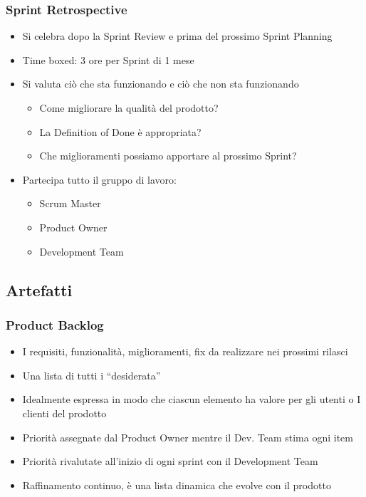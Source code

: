 \subsubsection{Sprint Retrospective}
\begin{itemize}
    \item Si celebra dopo la Sprint Review e prima del prossimo Sprint Planning
    \item Time boxed: 3 ore per Sprint di 1 mese
    \item Si valuta ciò che sta funzionando e ciò che non sta funzionando
    \begin{itemize}
        \item Come migliorare la qualità del prodotto?
        \item La Definition of Done è appropriata?
        \item Che miglioramenti possiamo apportare al prossimo Sprint?
    \end{itemize}
    \item Partecipa tutto il gruppo di lavoro:
    \begin{itemize}
        \item Scrum Master
        \item Product Owner
        \item Development Team
    \end{itemize}
\end{itemize}

\subsection{Artefatti}

\subsubsection{Product Backlog}
\begin{itemize}
    \item I requisiti, funzionalità, miglioramenti, fix da realizzare nei prossimi rilasci
    \item Una lista di tutti i “desiderata”
    \item Idealmente espressa in modo che ciascun elemento ha valore per gli utenti o I clienti del prodotto
    \item Priorità assegnate dal Product Owner mentre il Dev. Team stima ogni item
    \item Priorità rivalutate all'inizio di ogni sprint con il Development Team
    \item Raffinamento continuo, è una lista dinamica che evolve con il prodotto
\end{itemize}

